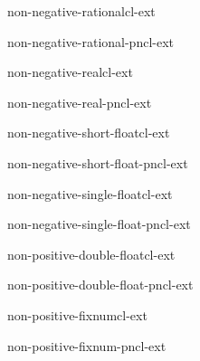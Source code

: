 \begin{type}{non-negative-rational}{}{cl-ext}{}
  
\end{type}

\begin{function}{non-negative-rational-p}{n}{cl-ext}{}
  
\end{function}

\begin{type}{non-negative-real}{}{cl-ext}{}
  
\end{type}

\begin{function}{non-negative-real-p}{n}{cl-ext}{}
  
\end{function}

\begin{type}{non-negative-short-float}{}{cl-ext}{}
  
\end{type}

\begin{function}{non-negative-short-float-p}{n}{cl-ext}{}
  
\end{function}

\begin{type}{non-negative-single-float}{}{cl-ext}{}
  
\end{type}

\begin{function}{non-negative-single-float-p}{n}{cl-ext}{}
  
\end{function}

\begin{type}{non-positive-double-float}{}{cl-ext}{}
  
\end{type}

\begin{function}{non-positive-double-float-p}{n}{cl-ext}{}
  
\end{function}

\begin{type}{non-positive-fixnum}{}{cl-ext}{}
  
\end{type}

\begin{function}{non-positive-fixnum-p}{n}{cl-ext}{}
  
\end{function}

